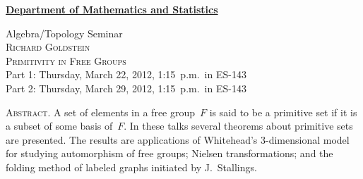 \documentclass[12pt]{article}
\begin{document}
\noindent\hspace{-28pt}\raisebox{-19pt}{\XeTeXpicfile UAlogo.jpg scaled 340}%
\hfill\textsf{\textbf{\footnotesize\href{http://www.albany.edu/math/}{Department of Mathematics and Statistics}}}\bigskip\bigskip\bigskip

\begin{center}\Large
  \textsf{\huge Algebra/Topology Seminar}\\[3\bigskipamount]
  \textsc{Richard Goldstein}\\[1.5\bigskipamount]
  \textsc{Primitivity in Free Groups}\\[3\bigskipamount]
  Part 1: Thursday, March 22, 2012, 1:15~p.m.\ in ES-143\\[\bigskipamount]
  Part 2: Thursday, March 29, 2012, 1:15~p.m.\ in ES-143
\end{center}\bigskip\bigskip\bigskip

\noindent\large\textsc{Abstract.}
A set of elements in a free group~$F$ is said to be a primitive set if it is a subset of some basis of~$F$. In these talks several theorems about primitive sets are presented. The results are applications of Whitehead's 3-dimensional model for studying automorphism of free groups; Nielsen transformations; and the folding method of labeled graphs initiated by J.~Stallings.
\end{document}
